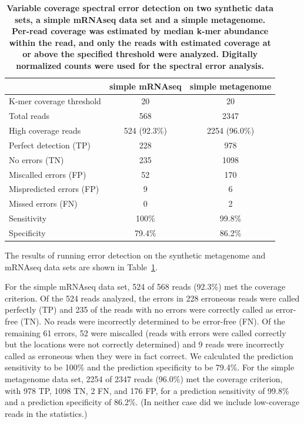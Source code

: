 \documentclass{article}
\begin{document}
\begin{table}
\begin{tabular}{|l|c||c|}
\hline
                            & {\bf simple mRNAseq } & {\bf simple metagenome}\\
\hline
K-mer coverage threshold    & 20                    & 20 \\
Total reads                 & 568                   & 2347 \\
High coverage reads         & 524 (92.3\%)          & 2254 (96.0\%) \\
\hline
Perfect detection (TP)      & 228                   & 978 \\
No errors (TN)              & 235                   & 1098 \\
Miscalled errors (FP)       & 52                    & 170\\
Mispredicted errors (FP)    & 9                     & 6 \\
Missed errors (FN)          & 0                     & 2 \\
\hline
Sensitivity                 & 100\%                 & 99.8\% \\
Specificity                 & 79.4\%                & 86.2\% \\
\hline
\end{tabular}

\caption{{\bf Variable coverage spectral error detection on two synthetic
  data sets, a simple mRNAseq data set and a simple metagenome.
  Per-read coverage was estimated by median k-mer abundance within the
  read, and only the reads with estimated coverage at or above the
  specified threshold were analyzed.  Digitally normalized counts were
  used for the spectral error analysis.}}
\label{tab:spectra_variable}
\end{table}

The results of running error detection on the synthetic metagenome and
mRNAseq data sets are shown in Table~\ref{tab:spectra_variable}.

For the simple mRNAseq data
set, 524 of 568 reads (92.3\%) met the coverage criterion.  Of the
524 reads analyzed, the errors in 228 erroneous reads were called
perfectly (TP) and 235 of the reads with no errors were correctly
called as error-free (TN).  No reads were incorrectly determined
to be error-free (FN).  Of the remaining 61 errors, 52 were miscalled
(reads with errors were called correctly but the locations were
not correctly determined) and 9 reads were incorrectly called as erroneous
when they were in fact correct.  We calculated the prediction
sensitivity to be 100\% and the prediction specificity to be
79.4\%.
For the simple metagenome data set,
2254 of 2347 reads (96.0\%) met the coverage criterion, with 978 TP,
1098 TN, 2 FN, and 176 FP, for a prediction sensitivity of 99.8\% and
a prediction specificity of 86.2\%.  (In neither case did we include
low-coverage reads in the statistics.)
\end{document}
